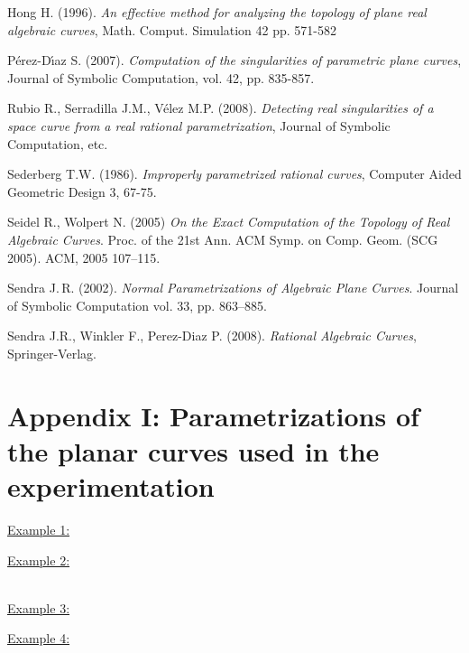 \documentclass{elsart}
\begin{document}
\begin{thebibliography}{56}
 Hong H. (1996). {\it An effective
method for analyzing the topology of plane real algebraic curves},
Math. Comput. Simulation 42 pp. 571-582

 P\'erez-D\'{\i}az S. (2007). {\it Computation of the singularities of parametric plane curves}, Journal of Symbolic Computation, vol. 42, pp. 835-857.



 Rubio R., Serradilla J.M., V\'elez M.P. (2008). {\it Detecting real singularities of a space curve from a real rational parametrization}, Journal of Symbolic Computation, etc.




 Sederberg T.W. (1986). {\it Improperly parametrized rational curves}, Computer Aided Geometric Design 3, 67-75.

 Seidel R., Wolpert N. (2005) {\it On the Exact Computation of the
Topology of Real Algebraic Curves}. Proc. of the 21st Ann. ACM Symp. on Comp. Geom. (SCG 2005). ACM, 2005 107--115.

 Sendra J.\,R. (2002).
{\it Normal Parametrizations of Algebraic Plane Curves}.
 Journal of Symbolic Computation vol. 33, pp. 863--885.







 Sendra J.R., Winkler F., Perez-Diaz P. (2008). {\it Rational Algebraic Curves}, Springer-Verlag.





\end{thebibliography}


\newpage

\section*{Appendix I: Parametrizations of the planar curves used in
the experimentation}\label{appen}

\underline{Example 1:}




\underline{Example 2:}

\\


\underline{Example 3:}



\underline{Example 4:}
\end{document}
